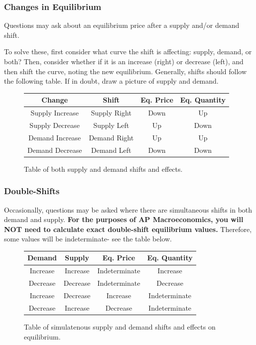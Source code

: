 \documentclass[12pt, a4paper]{article}
\theoremstyle{definition}
\begin{document}
\subsubsection{Changes in Equilibrium}
Questions may ask about an equilibrium price after a supply and/or demand shift.

To solve these, first consider what curve the shift is affecting: supply, demand, or both?
Then, consider whether if it is an increase (right) or decrease (left), and then shift the curve, noting the new equilibrium.
Generally, shifts should follow the following table.
If in doubt, draw a picture of supply and demand.


\begin{figure}[ht] %
    \centering
    \begin{tabular}{ |c|c|c|c| } 
        \hline
        Change & Shift & Eq. Price & Eq. Quantity  \\
        \hline
        Supply Increase & Supply Right  & Down  & Up   \\
        Supply Decrease & Supply Left   & Up    & Down \\ 
        Demand Increase & Demand Right  & Up    & Up   \\ 
        Demand Decrease & Demand Left   & Down  & Down \\
        \hline
    \end{tabular}
    \caption{Table of both supply and demand shifts and effects.}
    \label{fig:shifts}
\end{figure}

\subsubsection{Double-Shifts}
Occasionally, questions may be asked where there are simultaneous shifts in both demand and supply.
\textbf{For the purposes of AP Macroeconomics, you will NOT need to calculate exact double-shift equilibrium values.}
Therefore, some values will be indeterminate- see the table below.

\begin{figure}[ht] %
    \centering
    \begin{tabular}{ |c|c|c|c| } 
        \hline
        Demand & Supply & Eq. Price & Eq. Quantity  \\
        \hline
        Increase & Increase & Indeterminate & Increase      \\
        Decrease & Decrease & Indeterminate & Decrease      \\ 
        Increase & Decrease & Increase      & Indeterminate \\ 
        Decrease & Increase & Decrease      & Indeterminate \\
        \hline
    \end{tabular}
    \caption{Table of simulatenous supply and demand shifts and effects on equilibrium.}
    \label{fig:dshifts}
\end{figure}
\end{document}
